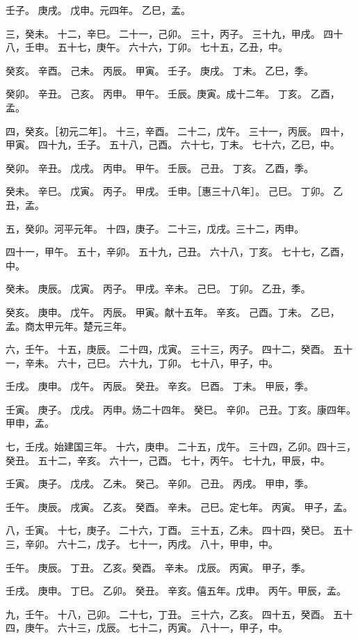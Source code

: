 \documentclass[]{article}
\begin{document}
壬子。 庚戌。 戊申。元四年。 乙巳，孟。

三，癸未。 十二，辛巳。 二十一，己卯。 三十，丙子。 三十九，甲戌。
四十八，壬申。 五十七，庚午。 六十六，丁卯。 七十五，乙丑，中。

癸亥。 辛酉。 己未。 丙辰。 甲寅。 壬子。 庚戌。 丁未。 乙巳，季。

癸卯。 辛丑。 己亥。 丙申。 甲午。 壬辰。庚寅。成十二年。 丁亥。
乙酉，孟。

四，癸亥。［初元二年］。 十三，辛酉。 二十二，戊午。 三十一，丙辰。
四十，甲寅。 四十九，壬子。 五十八，己酉。 六十七，丁未。
七十六，乙巳，中。

癸卯。 辛丑。 戊戌。 丙申。 甲午。 壬辰。 己丑。 丁亥。 乙酉，季。

癸未。 辛巳。 戊寅。 丙子。 甲戌。 壬申。［惠三十八年］。 己巳。 丁卯。
乙丑，孟。

五，癸卯。河平元年。 十四，庚子。 二十三，戊戌。三十二，丙申。

四十一，甲午。 五十，辛卯。 五十九，己丑。 六十八，丁亥。
七十七，乙酉，中。

癸未。 庚辰。 戊寅。 丙子。 甲戌。辛未。 己巳。 丁卯。 乙丑，季。

癸亥。 庚申。 戊午。 丙辰。 甲寅。献十五年。 辛亥。 己酉。丁未。
乙巳，孟。商太甲元年。楚元三年。

六，壬午。 十五，庚辰。 二十四，戊寅。 三十三，丙子。 四十二，癸酉。
五十一，辛未。 六十，己巳。 六十九，丁卯。 七十八，甲子，中。

壬戌。 庚申。 戊午。 丙辰。 癸丑。 辛亥。 巳酉。 丁未。 甲辰，季。

壬寅。 庚子。 戊戌。 丙申。炀二十四年。 癸巳。 辛卯。
己丑。丁亥。康四年。甲申，孟。

七，壬戌。始建国三年。 十六，庚申。 二十五，戊午。
三十四，乙卯。四十三，癸丑。 五十二，辛亥。 六十一，己酉。 七十，丙午。
七十九，甲辰，中。

壬寅。 庚子。 戊戌。 乙未。 癸己。 辛卯。 己丑。 丙戌。 甲申，季。

壬午。 庚辰。 戌寅。 乙亥。 癸酉。 辛未。 己巳。定七年。 丙寅。
甲子，孟。

八，壬寅。 十七，庚子。 二十六，丁酉。 三十五，乙未。 四十四，癸巳。
五十三，辛卯。 六十二，戊子。 七十一，丙戌。 八十，甲申，中。

壬午。 庚辰。 丁丑。 乙亥。癸酉。 辛未。 戊辰。 丙寅。 甲子，季。

壬戌。 庚申。 丁巳。 乙卯。 癸丑。 辛亥。僖五年。戊申。 丙午。甲辰，孟。

九，壬午。 十八，己卯。 二十七，丁丑。 三十六，乙亥。 四十五，癸酉。
五十四，庚午。 六十三，戊辰。 七十二，丙寅。 八十一，甲子，中。
\end{document}
